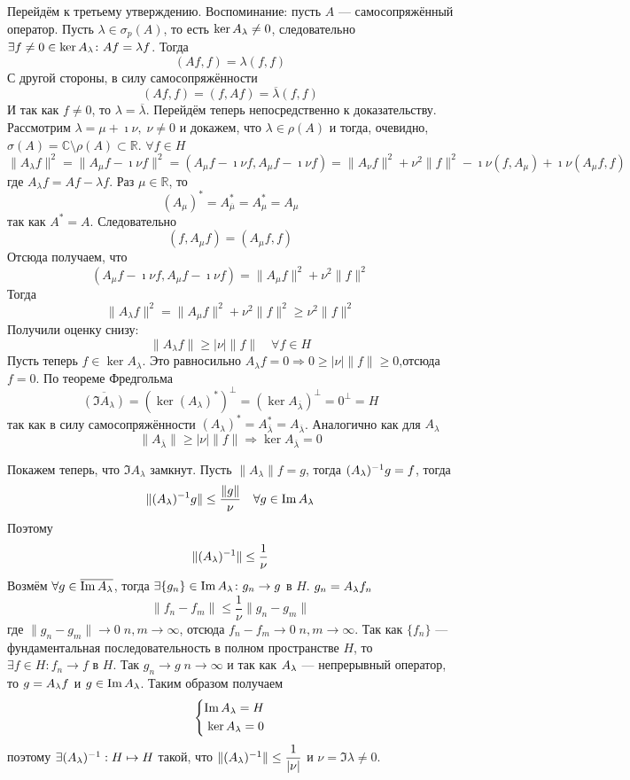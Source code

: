 \documentclass[14pt]{extarticle}
\begin{document}
\begin{Proof}
    Перейдём к третьему утверждению.
    Воспоминание: пусть $A$ --- самосопряжённый оператор.
    Пусть $\lambda \in \sigma_p(A)$, то есть $\ker A_\lambda \ne 0$, следовательно
    $\exists f \ne 0 \in \ker A_\lambda\colon Af = \lambda f$.
    Тогда 
    $$
    (Af, f) = \lambda (f, f)
    $$
    С другой стороны, в силу самосопряжённости
    $$
    (Af, f) = (f, Af) = \overline{\lambda}(f, f)
    $$
    И так как $f \ne 0$, то $\lambda = \overline{\lambda}$.
    Перейдём теперь непосредственно к доказательству.
    Рассмотрим $\lambda = \mu + \imath \nu,\; \nu \ne 0$ и докажем, что
    $\lambda \in \rho(A)$ и тогда, очевидно, $\sigma(A)
    = \mathbb C \setminus \rho(A) \subset \mathbb R$.
    $\forall f \in H$
    $$
    \|A_\lambda f\|^2 = \|A_\mu f - \imath \nu f\|^2 = (A_\mu f - \imath \nu
    f, A_\mu f - \imath \nu f) = \|A_\nu f\|^2 + 
    \nu^2 \|f\|^2 - \imath \nu (f, A_\mu) + \imath \nu (A_\mu f, f)
    $$
    где $A_\lambda f = Af - \lambda f$.
    Раз $\mu \in \mathbb R$, то 
    $$
    (A_\mu)^* = A^*_{\overline{\mu}} = A^*_\mu = A_\mu
    $$
    так как $A^* = A$.
    Следовательно
    $$
    (f, A_\mu f) = (A_\mu f, f)
    $$
    Отсюда получаем, что
    $$
    (A_\mu f - \imath \nu f, A_\mu f - \imath \nu f) = \|A_\mu f\|^2 + \nu^2
    \|f\|^2
    $$
    Тогда
    $$
    \|A_\lambda f\|^2 = \|A_\mu f\|^2 + \nu^2\|f\|^2 \ge \nu^2 \|f\|^2
    $$
    Получили оценку снизу:
    $$
    \|A_\lambda f\| \ge |\nu| \|f\| \quad \forall f \in H
    $$
    Пусть теперь $f \in \ker A_\lambda$.
    Это равносильно $A_\lambda f = 0 \Rightarrow 0 \ge |\nu|\|f\| \ge
    0$,отсюда $f = 0$.
    По теореме Фредгольма 
    $$
    \overline{(\Im A_\lambda)} = (\ker(A_\lambda)^*)^\perp = (\ker
    A_{\overline
    {\lambda}})^\perp = 0^\perp = H
    $$
    так как в силу самосопряжённости $(A_\lambda)^* = A^*_{\overline{\lambda}} 
    = A_{\overline{\lambda}}$.
    Аналогично как для $A_\lambda$
    $$
    \|A_{\overline{\lambda}}\| \ge |\nu| \|f\| \Rightarrow \ker
    A_{\overline{\lambda}} = 0
    $$
    
    Покажем теперь, что $\Im A_\lambda$ замкнут.
    Пусть $\|A_\lambda\|f = g$, тогда $(A_\lambda)^{-1} g =f$, тогда
    $$
    \|(A_\lambda)^{-1} g\| \le \dfrac{\|g\|}{\nu} \quad \forall g \in \operatorname{Im} A_\lambda
    $$
    Поэтому
    $$
    \|(A_\lambda)^{-1}\| \le \dfrac{1}{\nu}
    $$
    Возмём $\forall g \in \overline{\operatorname{Im} A_\lambda}$, тогда $\exists \{g_n\} \in \operatorname{Im}
    A_\lambda\colon g_n \to g$ в $H$.
    $g_n = A_\lambda f_n$
    $$
    \|f_n - f_m\| \le \dfrac{1}{\nu}\|g_n - g_m\|
    $$
    где $\|g_n - g_m\| \to 0\; n,m \to \infty$, отсюда $f_n - f_m \to 0\; n,m 
    \to \infty$.
    Так как $\{f_n\}$ --- фундаментальная последовательность в полном 
    пространстве $H$, то $\exists f \in H\colon f_n \to f$ 
    в $H$.
    Так $g_n \to g\; n \to \infty$ и так как $A_\lambda$ --- непрерывный оператор, 
    то $g = A_\lambda f$ и $g \in \operatorname{Im} A_\lambda$.
    Таким образом получаем
    $$
    \left\{
        \begin{aligned}
            \operatorname{Im} A_\lambda = H\\
            \ker A_\lambda = 0
        \end{aligned}
   \right.
   $$
   поэтому $\exists (A_\lambda)^{-1} : H \mapsto H$ такой, что $\|(A_\lambda)^{-1}\| \le \dfrac{1}{|
   \nu|}$ и $\nu = \Im \lambda \ne 0$.
\end{Proof}
\end{document}

